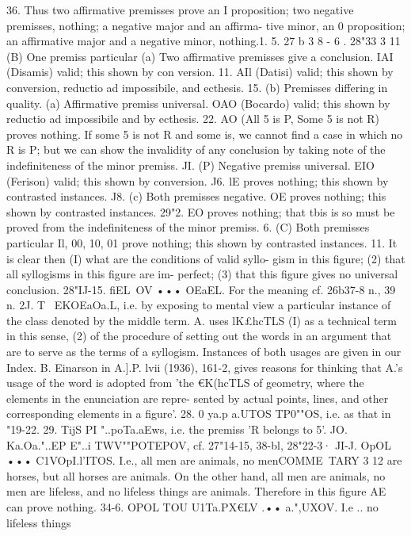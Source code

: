 {36. Thus two affirmative premisses prove an I proposition;
two negative premisses, nothing; a negative major and an affirma-
tive minor, an 0 proposition; an affirmative major and a
negative minor, nothing.1. 5. 27 b 3 8 - 6 . 28"33
3 11
(B) One premiss particular
(a) Two affirmative premisses give a conclusion. IAI (Disamis)
valid; this shown by con version.
11. AIl (Datisi) valid; this shown by conversion, reductio ad
impossibile, and ecthesis.
15. (b) Premisses differing in quality. (a) Affirmative premiss
universal. OAO (Bocardo) valid; this shown by reductio ad
impossibile and by ecthesis.
22. AO (All 5 is P, Some 5 is not R) proves nothing. If some 5
is not R and some is, we cannot find a case in which no R is P; but
we can show the invalidity of any conclusion by taking note of
the indefiniteness of the minor premiss.
JI. (P) Negative premiss universal. EIO (Ferison) valid; this
shown by conversion.
J6. lE proves nothing; this shown by contrasted instances.
J8. (c) Both premisses negative. OE proves nothing; this
shown by contrasted instances.
29"2. EO proves nothing; that tbis is so must be proved from
the indefiniteness of the minor premiss.
6.
(C) Both premisses particular
Il, 00, 10, 01 prove nothing; this shown by contrasted
instances.
11. It is clear then (I) what are the conditions of valid syllo-
gism in this figure; (2) that all syllogisms in this figure are im-
perfect; (3) that this figure gives no universal conclusion.
28"IJ-15.
fiEL~OV •••
OEaEL. For the meaning cf. 26b37-8 n.,
39 n.
2J. T~ EKOEaOa.L, i.e. by exposing to mental view a particular
instance of the class denoted by the middle term. A. uses lK£hcTLS
(I) as a technical term in this sense, (2) of the procedure of
setting out the words in an argument that are to serve as the
terms of a syllogism. Instances of both usages are given in our
Index. B. Einarson in A.].P. lvii (1936), 161-2, gives reasons for
thinking that A.'s usage of the word is adopted from 'the €K(hcTLS
of geometry, where the elements in the enunciation are repre-
sented by actual points, lines, and other corresponding elements
in a figure'.
28. 0 ya.p a.UTOS TP0""OS, i.e. as that in "19-22.
29. TijS PI "..poTa.aEws, i.e. the premiss 'R belongs to 5'.
JO. Ka.Oa."..EP E"..i TWV""POTEPOV, cf. 27"14-15, 38-bl, 28"22-3·
JI-J. OpOL ••• C1VOpI.l'ITOS. I.e., all men are animals, no menCOMME~TARY
3 12
are horses, but all horses are animals. On the other hand, all
men are animals, no men are lifeless, and no lifeless things are
animals. Therefore in this figure AE can prove nothing.
34-6. OPOL TOU U1Ta.PX€LV .•• a.",UXOV. I.e .. no lifeless things
}
